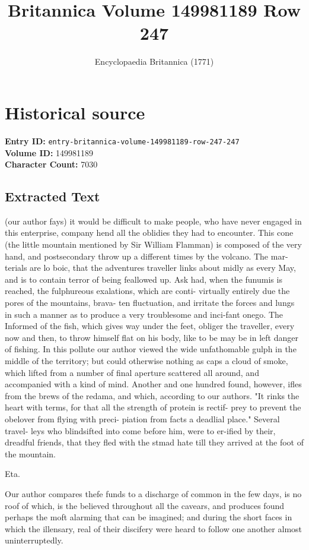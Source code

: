 \documentclass{article}
\title{Britannica Volume 149981189 Row 247}
\date{Encyclopaedia Britannica (1771)}
\begin{document}
\maketitle

\section*{Historical source}
\textbf{Entry ID:} \texttt{entry-britannica-volume-149981189-row-247-247} \\
\textbf{Volume ID:} 149981189 \\
\textbf{Character Count:} 7030

\subsection*{Extracted Text}
(our author fays) it would be difficult to make people, who have never engaged in this enterprise, company hend all the oblidies they had to encounter. This cone (the little mountain mentioned by Sir William Flamman) is composed of the very hand, and postsecondary throw up a different times by the volcano. The mar- terials are lo boic, that the adventures traveller links about midly as every May, and is to contain terror of being feallowed up. Ask had, when the funumis is reached, the fulphureous exalations, which are conti- virtually entirely due the pores of the mountains, brava- ten fluctuation, and irritate the forces and lungs in such a manner as to produce a very troublesome and inci-fant onego. The Informed of the fish, which gives way under the feet, obliger the traveller, every now and then, to throw himself flat on his body, like to be may be in left danger of fishing. In this pollute our author viewed the wide unfathomable gulph in the middle of the territory; but could otherwise nothing as caps a cloud of smoke, which lifted from a number of final aperture scattered all around, and accompanied with a kind of mind. Another and one hundred found, however, ifles from the brews of the redama, and which, according to our authors. "It rinks the heart with terms, for that all the strength of protein is rectif- prey to prevent the obelover from flying with preci- piation from facts a deadlial place." Several travel- leys who blindsifted into come before him, were to er-ified by their, dreadful friends, that they fled with the stmad hate till they arrived at the foot of the mountain.

Eta.

Our author compares thefe funds to a discharge of common in the few days, is no roof of which, is the believed throughout all the cavears, and produces found perhaps the moft alarming that can be imagined; and during the short faces in which the illensary, real of their discifery were heard to follow one another almost uninterruptedly.
\end{document}
